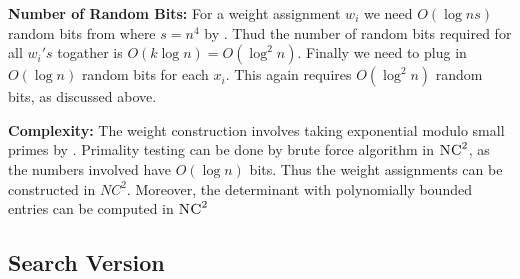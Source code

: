 \textbf{Number of Random Bits:}	For a weight assignment $w_i$ we need $O(\log ns)$ random bits from  where $s=n^4$ by . Thud the number of random bits required for all $w_i's$ togather is $O(k\log n)=O(\log^2 n)$. Finally we need to plug in $O(\log n)$ random bits for each $x_i$. This again requires $O(\log ^2n)$ random bits, as discussed above.\vspace{2mm}

\textbf{Complexity:} The weight construction involves taking exponential modulo small primes by . Primality testing can be done by brute force algorithm in $\textsc{NC}^2$, as the numbers involved have $O(\log n)$ bits. Thus the weight assignments can be constructed in $NC^2$. Moreover, the determinant with polynomially bounded entries can be computed in $\textsc{NC}^2$ \cite{Berkowitz_1984_Oct} 
\subsection{Search Version}